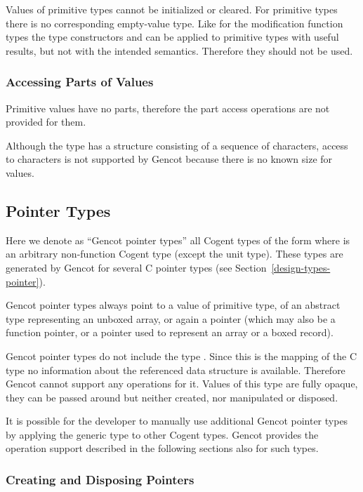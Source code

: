 Values of primitive types cannot be initialized or cleared. For primitive types there is no corresponding empty-value type.
Like for the modification function types the type constructors
 and  can be applied to primitive types with useful results, but not with the intended semantics.
Therefore they should not be used.

\subsubsection{Accessing Parts of Values}

Primitive values have no parts, therefore the part access operations are not provided for them.

Although the type  has a structure consisting of a sequence of characters, access to characters is not supported
by Gencot because there is no known size for  values.

\subsection{Pointer Types}
\label{design-operations-pointer}

Here we denote as ``Gencot pointer types'' all Cogent types of the form  where  is an arbitrary non-function
Cogent type (except the unit type). These types are generated by Gencot for several C pointer types (see Section~\ref{design-types-pointer}).

Gencot pointer types always point to a value of primitive type, of an abstract type representing an unboxed array, or again a pointer 
(which may also be a function pointer, or a pointer used to represent an array or a boxed record).

Gencot pointer types do not include the type . Since this is the mapping of the C type  no information 
about the referenced data structure is available. Therefore Gencot cannot support any operations 
for it. Values of this type are fully opaque, they can be passed around but neither created, nor manipulated or disposed. 

It is possible for the developer to manually use additional Gencot pointer types by applying the generic type  to other
Cogent types. Gencot provides the operation support described in the following sections also for such types.

\subsubsection{Creating and Disposing Pointers}

